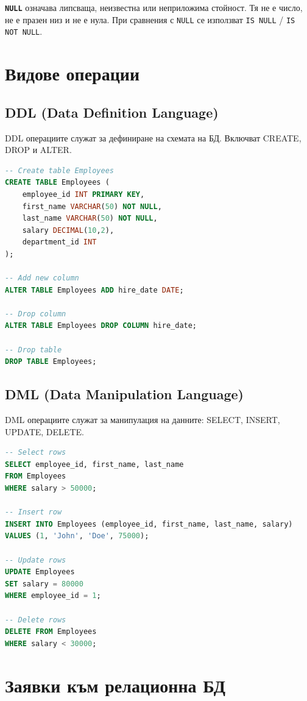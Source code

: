 \documentclass{scrartcl}
\begin{document}
\begin{FlushLeft}
\textbf{\texttt{NULL}} означава липсваща, неизвестна или неприложима стойност. Тя не е число, не е празен низ и не е нула. При сравнения с \texttt{NULL} се използват \texttt{IS NULL} / \texttt{IS NOT NULL}.

\section{Видове операции}

\subsection{DDL (Data Definition Language)}

DDL операциите служат за дефиниране на схемата на БД. Включват CREATE, DROP и ALTER.

\begin{lstlisting}[language=SQL, caption=DDL examples]
-- Create table Employees
CREATE TABLE Employees (
    employee_id INT PRIMARY KEY,
    first_name VARCHAR(50) NOT NULL,
    last_name VARCHAR(50) NOT NULL,
    salary DECIMAL(10,2),
    department_id INT
);

-- Add new column
ALTER TABLE Employees ADD hire_date DATE;

-- Drop column
ALTER TABLE Employees DROP COLUMN hire_date;

-- Drop table
DROP TABLE Employees;
\end{lstlisting}

\subsection{DML (Data Manipulation Language)}

DML операциите служат за манипулация на данните: SELECT, INSERT, UPDATE, DELETE.

\begin{lstlisting}[language=SQL, caption=DML examples]
-- Select rows
SELECT employee_id, first_name, last_name
FROM Employees
WHERE salary > 50000;

-- Insert row
INSERT INTO Employees (employee_id, first_name, last_name, salary)
VALUES (1, 'John', 'Doe', 75000);

-- Update rows
UPDATE Employees
SET salary = 80000
WHERE employee_id = 1;

-- Delete rows
DELETE FROM Employees
WHERE salary < 30000;
\end{lstlisting}

\section{Заявки към релационна БД}


\end{FlushLeft}
\end{document}
